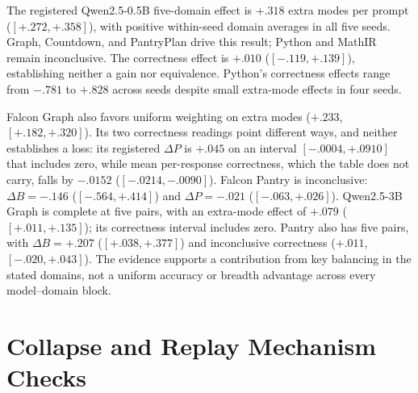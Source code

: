 \documentclass{article}
\newcommand{\1}{\mathbf 1}
\theoremstyle{remark}
\theoremstyle{definition}
\theoremstyle{plain}
\begin{document}
The registered Qwen2.5-0.5B five-domain effect is $+.318$ extra modes per
prompt ($[+.272,+.358]$), with positive within-seed domain averages in all
five seeds. Graph, Countdown, and PantryPlan drive this result; Python and
MathIR remain inconclusive. The correctness effect is $+.010$
($[-.119,+.139]$), establishing neither a gain nor equivalence. Python's
correctness effects range from $-.781$ to $+.828$ across seeds despite
small extra-mode effects in four seeds.

Falcon Graph also favors uniform weighting on extra modes ($+.233$,
$[+.182,+.320]$). Its two correctness readings point different ways, and
neither establishes a loss: its registered $\Delta P$
is $+.045$ on an interval $[-.0004,+.0910]$ that
includes zero, while mean per-response correctness, which the table does not
carry, falls by $-.0152$ ($[-.0214,-.0090]$). Falcon Pantry is
inconclusive: $\Delta B=-.146$ ($[-.564,+.414]$) and $\Delta P=-.021$
($[-.063,+.026]$). Qwen2.5-3B Graph is complete at five pairs, with an extra-mode effect of
$+.079$ ($[+.011,+.135]$); its correctness interval includes zero.
Pantry also has five pairs, with $\Delta B=+.207$
($[+.038,+.377]$) and inconclusive correctness ($+.011$, $[-.020,+.043]$).
The evidence supports a contribution from key balancing in the stated domains, not a
uniform accuracy or breadth advantage across every model--domain block.



\section{Collapse and Replay Mechanism Checks}
\label{app:ablations}


\end{document}
